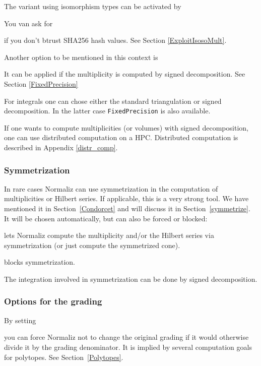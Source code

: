 The variant using isomorphism types can be activated by
\begin{itemize}
\end{itemize}
You van ask for
\begin{itemize}
	\itemtt[StrictTypeChecking]
\end{itemize}
if you don't btrust SHA256 hash values. See Section \ref{ExploitIsosoMult}.

Another option to be mentioned in this context is
\begin{itemize}
	\itemtt[FixedPrecision]
\end{itemize}
It can be applied if the multiplicity is computed by signed decomposition. See Section \ref{FixedPrecision}

For integrals one can chose either the standard triangulation or signed decomposition. In the latter case \verb|FixedPrecision| is also available.

If one wants to compute multiplicities (or volumes)  with signed decomposition, one can use distributed computation on a HPC. Distributed computation is described in Appendix \ref{distr_comp}.

\subsubsection{Symmetrization}

In rare cases Normaliz can use symmetrization in the computation of multiplicities or Hilbert series. If applicable, this is a very strong tool. We have mentioned it in Section~\ref{Condorcet} and will discuss it in Section~\ref{symmetrize}. It will be chosen automatically, but can also be forced or blocked:
\begin{itemize}
	\itemtt[Symmetrize, -Y] lets Normaliz compute the multiplicity and/or the Hilbert series via symmetrization (or just compute the symmetrized cone).
	
	\itemtt[NoSymmetrization] blocks symmetrization.
\end{itemize}

The integration involved in symmetrization can be done by signed decomposition.



\subsubsection{Options for the grading}

By setting
\begin{itemize}
	\itemtt[NoGradingDenom]
\end{itemize}
you can force Normaliz not to change the original grading if it would otherwise divide it by the grading denominator. It is implied by several computation goals for polytopes. See Section~\ref{Polytopes}.

